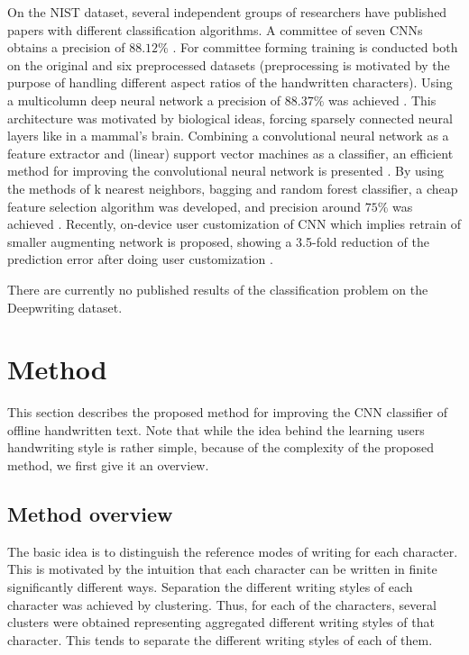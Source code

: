 \documentclass{article}
\begin{document}
On the NIST dataset, several independent groups of researchers have published papers with different classification algorithms.
A committee of seven CNNs obtains a precision of $88.12\%$ \citet{nist1}.
For committee forming training is conducted both on the original and six preprocessed datasets
(preprocessing is motivated by the purpose of handling different aspect ratios of the handwritten characters).
Using a multicolumn deep neural network a precision of $88.37\%$ was achieved \citet{nist2}.
This architecture was motivated by biological ideas, forcing sparsely connected neural layers like in a mammal's brain.
Combining a convolutional neural network as a feature extractor and (linear) support vector machines as a classifier,
an efficient method for improving the convolutional neural network is presented \cite{nist3}.
By using the methods of k nearest neighbors, bagging and random forest classifier, a cheap feature selection algorithm was developed,
and precision around $75\%$ was achieved \citet{nist4}.
Recently, on-device user customization of CNN which implies retrain of smaller augmenting network is proposed,
showing a 3.5-fold reduction of the prediction error after doing user customization \citet{nist5}.

There are currently no published results of the classification problem on the Deepwriting dataset.

\section{Method}

This section describes the proposed method for improving the CNN classifier of offline handwritten text.
Note that while the idea behind the learning users handwriting style is rather simple, because of the complexity of the proposed method, we first give it an overview.

\subsection{Method overview}

The basic idea is to distinguish the reference modes %
of writing for each character.
This is motivated by the intuition that each character can be written in finite significantly different ways.
Separation the different writing styles of each character was achieved by clustering.
Thus, for each of the characters, several clusters were obtained representing aggregated different writing styles of that character.
This tends to separate the different writing styles of each of them.
\end{document}
